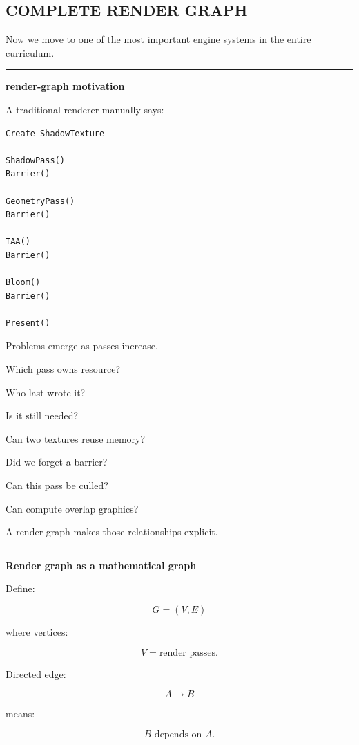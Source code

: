 \subsection{COMPLETE RENDER GRAPH}\label{06-engine-ii-ch043-complete-render-graph}

\hypertarget{06-engine-ii-ch043-complete-render-graph}{}

Now we move to one of the most important engine systems in the entire curriculum.

\begin{center}\rule{0.5\linewidth}{0.5pt}\end{center}

\textbf{render-graph motivation}

A traditional renderer manually says:

\begin{verbatim}
Create ShadowTexture

ShadowPass()
Barrier()

GeometryPass()
Barrier()

TAA()
Barrier()

Bloom()
Barrier()

Present()
\end{verbatim}

Problems emerge as passes increase.

Which pass owns resource?

Who last wrote it?

Is it still needed?

Can two textures reuse memory?

Did we forget a barrier?

Can this pass be culled?

Can compute overlap graphics?

A render graph makes those relationships explicit.

\begin{center}\rule{0.5\linewidth}{0.5pt}\end{center}

\textbf{Render graph as a mathematical graph}

Define:

\[
G=(V,E)
\]

where vertices:

\[
V=
\text{render passes}.
\]

Directed edge:

\[
A\rightarrow B
\]

means:

\[
\boxed{
B\text{ depends on }A.
}
\]


